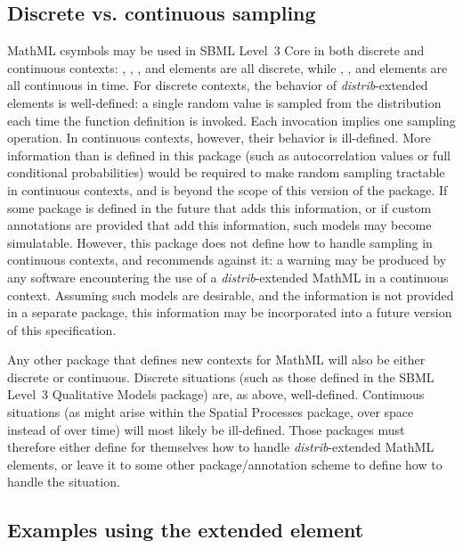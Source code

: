 \documentclass[draftspec]{sbmlpkgspec}
\newcommand{\sbmlthreecore}{SBML Level~3 Core\xspace}
\newcommand{\distribshort}{\emph{distrib}\xspace}
\newcommand{\mathml}{MathML\xspace}
\begin{document}
\subsection{Discrete vs. continuous sampling}
\label{discrete-continuous}

\mathml csymbols may be used in \sbmlthreecore in both discrete and continuous contexts:  \InitialAssignment, \EventAssignment, \Priority, and \Delay elements are all discrete, while \Rule, \KineticLaw, and \Trigger elements are all continuous in time.  For discrete contexts, the behavior of \distribshort-extended \FunctionDefinition elements is well-defined:  a single random value is sampled from the distribution each time the function definition is invoked. Each invocation implies one sampling operation.  In continuous contexts, however, their behavior is ill-defined.  More information than is defined in this package (such as autocorrelation values or full conditional probabilities) would be required to make random sampling tractable in continuous contexts, and is beyond the scope of this version of the package.  If some package is defined in the future that adds this information, or if custom annotations are provided that add this information, such models may become simulatable.  However, this package does not define how to handle sampling in continuous contexts, and recommends against it: a warning may be produced by any software encountering the use of a \distribshort-extended \mathml in a continuous context.  Assuming such models are desirable, and the information is not provided in a separate package, this information may be incorporated into a future version of this specification.

Any other package that defines new contexts for MathML will also be either discrete or continuous.  Discrete situations (such as those defined in the SBML Level~3 Qualitative Models package) are, as above, well-defined.  Continuous situations (as might arise within the Spatial Processes package, over space instead of over time) will most likely be ill-defined.  Those packages must therefore either define for themselves how to handle \distribshort-extended \mathml elements, or leave it to some other package/annotation scheme to define how to handle the situation.



\subsection{Examples using the extended  element}
\label{sec:cs-examples}
\end{document}
